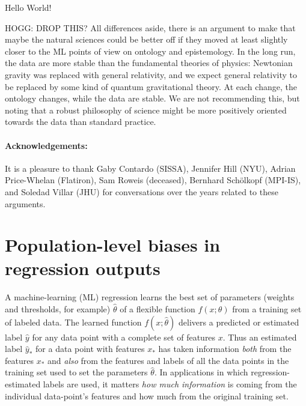 \documentclass[11pt]{article}
\begin{document}
Hello World!

HOGG: DROP THIS? All differences aside, there is an argument to make that maybe the natural sciences could be better off if they moved at least slightly closer to the ML points of view on ontology and epistemology.
In the long run, the data are more stable than the fundamental theories of physics:
Newtonian gravity was replaced with general relativity, and we expect general relativity to be replaced by some kind of quantum gravitational theory.
At each change, the ontology changes, while the data are stable.
We are not recommending this, but noting that a robust philosophy of science might be more positively oriented towards the data than standard practice.

\paragraph{Acknowledgements:}
It is a pleasure to thank
  Gaby Contardo (SISSA),
  Jennifer Hill (NYU),
  Adrian Price-Whelan (Flatiron),
  Sam Roweis (deceased),
  Bernhard Sch\"olkopf (MPI-IS), and
  Soledad Villar (JHU)
for conversations over the years related to these arguments.

{\raggedright


}

\clearpage\appendix
\section{Population-level biases in regression outputs}\label{app:toy}
A machine-learning (ML) regression learns the best set of parameters (weights and thresholds, for example) $\hat{\theta}$ of a flexible function $f(x;\theta)$ from a training set of labeled data.
The learned function $f(x;\hat{\theta})$ delivers a predicted or estimated label $\hat{y}$ for any data point with a complete set of features $x$.
Thus an estimated label $\hat{y}_\ast$ for a data point with features $x_\ast$ has taken information \emph{both} from the features $x_\ast$ and \emph{also} from the features and labels of all the data points in the training set used to set the parameters $\hat{\theta}$.
In applications in which regression-estimated labels are used, it matters \emph{how much information} is coming from the individual data-point's features and how much from the original training set.
\end{document}
